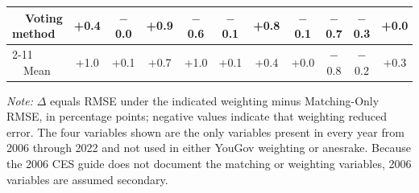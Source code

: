 \begin{table}[!htbp]
{\begin{threeparttable}
\begin{tabular}{lcccccccccc}
~~Voting method & +0.4 & $-$0.0 & +0.9 & $-$0.6 & $-$0.1 & +0.8 & $-$0.1 & $-$0.7 & $-$0.3 & +0.0 \\
\cmidrule(l){2-11}
~~Mean & +1.0 & +0.1 & +0.7 & +1.0 & +0.1 & +0.4 & +0.0 & $-$0.8 & $-$0.2 & +0.3 \\
\bottomrule
\end{tabular}
\begin{tablenotes}
\footnotesize
\item \textit{Note:} $\Delta$ equals RMSE under the indicated weighting minus Matching-Only RMSE, in percentage points; negative values indicate that weighting reduced error. The four variables shown are the only variables present in every year from 2006 through 2022 and not used in either YouGov weighting or anesrake. Because the 2006 CES guide does not document the matching or weighting variables, 2006 variables are assumed secondary.
\end{tablenotes}
\end{threeparttable}%
}
\end{table}